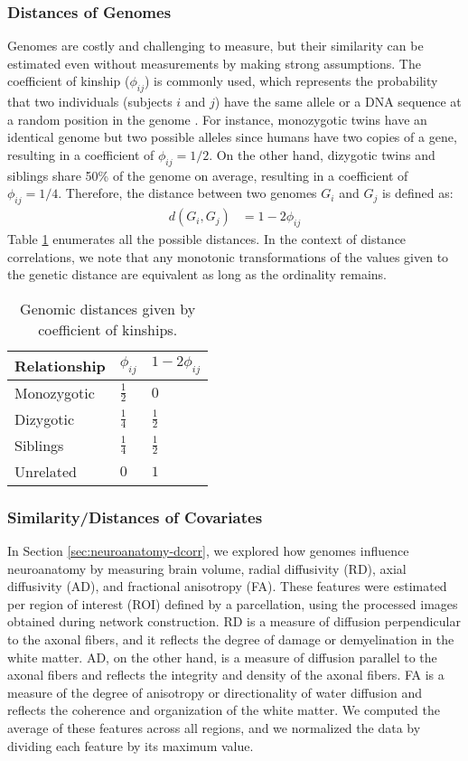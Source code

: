 \subsubsection{Distances of Genomes}
Genomes are costly and challenging to measure, but their similarity can be estimated even without measurements by making strong assumptions. The coefficient of kinship ($\phi_{ij}$) is commonly used, which represents the probability that two individuals (subjects $i$ and $j$) have the same allele or a DNA sequence at a random position in the genome \cite{speed2012improved}. For instance, monozygotic twins have an identical genome but two possible alleles since humans have two copies of a gene, resulting in a coefficient of $\phi_{ij}=1/2$. On the other hand, dizygotic twins and siblings share 50\% of the genome on average, resulting in a coefficient of $\phi_{ij}=1/4$. Therefore, the distance between two genomes $G_i$ and $G_j$ is defined as:
\begin{align*}
    d(G_i, G_j) &= 1- 2\phi_{ij}
\end{align*}
Table \ref{tab:genetic-distances} enumerates all the possible distances. In the context of distance correlations, we note that any monotonic transformations of the values given to the genetic distance are equivalent as long as the ordinality remains.

\begin{table}[h]
\centering
\begin{tabular}{l|ll}
Relationship & $\phi_{ij}$   & $1-2\phi_{ij}$ \\\hline
Monozygotic  & $\frac{1}{2}$ & $0$            \\
Dizygotic    & $\frac{1}{4}$ & $\frac{1}{2}$  \\
Siblings     & $\frac{1}{4}$ & $\frac{1}{2}$  \\
Unrelated   & $0$ & $1$
\end{tabular}
\caption{Genomic distances given by coefficient of kinships.}
\label{tab:genetic-distances}
\end{table}

\subsubsection{Similarity/Distances of Covariates} \label{methods:covariates}
In Section \ref{sec:neuroanatomy-dcorr}, we explored how genomes influence neuroanatomy by measuring brain volume, radial diffusivity (RD), axial diffusivity (AD), and fractional anisotropy (FA). These features were estimated per region of interest (ROI) defined by a parcellation, using the processed images obtained during network construction. RD is a measure of diffusion perpendicular to the axonal fibers, and it reflects the degree of damage or demyelination in the white matter. AD, on the other hand, is a measure of diffusion parallel to the axonal fibers and reflects the integrity and density of the axonal fibers. FA is a measure of the degree of anisotropy or directionality of water diffusion and reflects the coherence and organization of the white matter. We computed the average of these features across all regions, and we normalized the data by dividing each feature by its maximum value.


